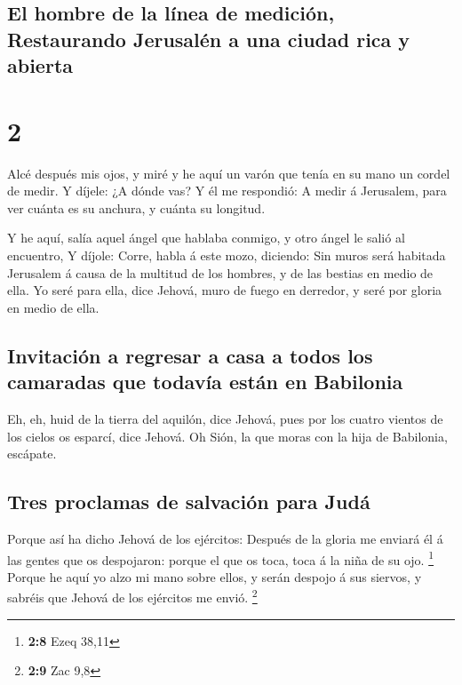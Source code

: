 \hypertarget{el-hombre-de-la-luxednea-de-mediciuxf3n-restaurando-jerusaluxe9n-a-una-ciudad-rica-y-abierta}{%
\subsection{El hombre de la línea de medición, Restaurando Jerusalén a
una ciudad rica y
abierta}\label{el-hombre-de-la-luxednea-de-mediciuxf3n-restaurando-jerusaluxe9n-a-una-ciudad-rica-y-abierta}}

\hypertarget{section-1}{%
\section{2}\label{section-1}}

 Alcé después mis ojos, y miré y he aquí un varón que
tenía en su mano un cordel de medir.  Y díjele: ¿A dónde
vas? Y él me respondió: A medir á Jerusalem, para ver cuánta es su
anchura, y cuánta su longitud.

 Y he aquí, salía aquel ángel que hablaba conmigo, y otro
ángel le salió al encuentro,  Y díjole: Corre, habla á
este mozo, diciendo: Sin muros será habitada Jerusalem á causa de la
multitud de los hombres, y de las bestias en medio de ella.
 Yo seré para ella, dice Jehová, muro de fuego en
derredor, y seré por gloria en medio de ella.

\hypertarget{invitaciuxf3n-a-regresar-a-casa-a-todos-los-camaradas-que-todavuxeda-estuxe1n-en-babilonia}{%
\subsection{Invitación a regresar a casa a todos los camaradas que
todavía están en
Babilonia}\label{invitaciuxf3n-a-regresar-a-casa-a-todos-los-camaradas-que-todavuxeda-estuxe1n-en-babilonia}}

 Eh, eh, huid de la tierra del aquilón, dice Jehová, pues
por los cuatro vientos de los cielos os esparcí, dice Jehová.
 Oh Sión, la que moras con la hija de Babilonia, escápate.

\hypertarget{tres-proclamas-de-salvaciuxf3n-para-juduxe1}{%
\subsection{Tres proclamas de salvación para
Judá}\label{tres-proclamas-de-salvaciuxf3n-para-juduxe1}}

 Porque así ha dicho Jehová de los ejércitos: Después de
la gloria me enviará él á las gentes que os despojaron: porque el que os
toca, toca á la niña de su ojo. \footnote{\textbf{2:8} Ezeq 38,11}
 Porque he aquí yo alzo mi mano sobre ellos, y serán
despojo á sus siervos, y sabréis que Jehová de los ejércitos me envió.
\footnote{\textbf{2:9} Zac 9,8}

